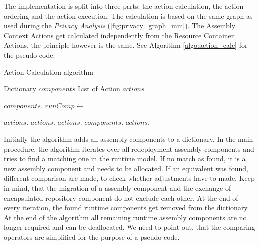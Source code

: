 The implementation is split into three parts: the action calculation, the action ordering and the action execution. The calculation is based on the same graph as used during the \textit{Privacy Analysis} (\autoref{fig:privacy_graph_mm}). The Assembly Context Actions get calculated independently from the Resource Container Actions, the principle however is the same. See Algorithm \autoref{algo:action_calc} for the pseudo code.

\begin{algorithm}[H]
	\caption{Action Calculation algorithm}
	\label{algo:action_calc}
	\begin{algorithmic}[1]
		
		\State Dictionary $components$
		\State List of Action $actions$
		\State
		
			\State
			$components.$
			\EndFor
		\EndProcedure
		\State
		\State
		\State
			\State
				$runComp\gets $ 
				
				 \State
					$actions.$
				\Else
						\State $actions.$
					\EndIf
						\State $actions.$
					\EndIf
				\EndIf
				\State $components.$
			\EndFor
			\State
				\State $actions.$
			\EndFor
		\EndProcedure
	\end{algorithmic}
\end{algorithm}

Initially the algorithm adds all assembly components to a dictionary. In the main procedure, the algorithm iterates over all redeployment assembly components and tries to find a matching one in the runtime model. If no match as found, it is a new assembly component and needs to be allocated. If an equivalent was found, different comparison are made, to check whether adjustments have to made. Keep in mind, that the migration of a assembly component and the exchange of encapsulated repository component do not exclude each other. At the end of every iteration, the found runtime components get removed from the dictionary. At the end of the algorithm all remaining runtime assembly components are no longer required and can be deallocated. We need to point out, that the comparing operators are simplified for the purpose of a pseudo-code.

